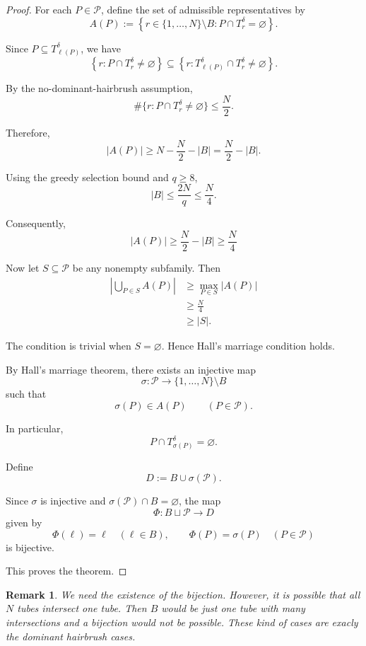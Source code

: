 \documentclass[11pt, letterpaper]{nyjm}
\newtheorem{remark}[theorem]{Remark}
\begin{document}
	
	\begin{proof}
		
		For each $P\in\mathcal P$, define the set
		of admissible representatives by
		\[
		A(P):=
		\left\{
		r\in\{1,\ldots,N\}\setminus B:
		P\cap T_r^\delta=\varnothing
		\right\}.
		\]
		
		Since $P\subseteq T_{\ell(P)}^\delta$, we have
		\[
		\left\{
		r:P\cap T_r^\delta\ne\varnothing
		\right\}
		\subseteq
		\left\{
		r:T_{\ell(P)}^\delta\cap T_r^\delta
		\ne\varnothing
		\right\}.
		\]
		
		By the no-dominant-hairbrush assumption,
		\[
		\#\{r:P\cap T_r^\delta\ne\varnothing\}
		\le \frac N2.
		\]
		
		Therefore,
		\[
		|A(P)|
		\ge N-\frac N2-|B|
		= \frac N2-|B|.
		\]
		
		Using the greedy selection bound and $q\ge8$,
		\[
		|B|\le\frac{2N}{q}\le\frac N4.
		\]
		
		Consequently,
		\[
		|A(P)|
		\ge\frac N2-|B|
		\ge\frac N4
		\]
		
		Now let $S\subseteq\mathcal P$ be any nonempty
		subfamily. Then
		\[
		\begin{aligned}
			\left|\bigcup_{P\in S}A(P)\right|
			&\ge \max_{P\in S}|A(P)|\\
			&\ge \frac N4 \\
			&\ge |S|.
		\end{aligned}
		\]
		
		The condition is trivial when $S=\varnothing$.
		Hence Hall's marriage condition holds.
		
		By Hall's marriage theorem, there exists
		an injective map
		\[
		\sigma:\mathcal P\longrightarrow
		\{1,\ldots,N\}\setminus B
		\]
		such that
		\[
		\sigma(P)\in A(P)
		\qquad(P\in\mathcal P).
		\]
		
		In particular,
		\[
		P\cap T_{\sigma(P)}^\delta=\varnothing.
		\]
		
		Define
		\[
		D:=B\cup\sigma(\mathcal P).
		\]
		
		Since $\sigma$ is injective and
		$\sigma(\mathcal P)\cap B=\varnothing$,
		the map
		\[
		\Phi:B\sqcup\mathcal P\longrightarrow D
		\]
		given by
		\[
		\Phi(\ell)=\ell\quad(\ell\in B),
		\qquad
		\Phi(P)=\sigma(P)\quad(P\in\mathcal P)
		\]
		is bijective.
		
		This proves the theorem.
	\end{proof}
	
	\begin{remark}
		We need the existence of the bijection. However, it is possible that all $N$ tubes intersect one tube. Then $B$ would be just one tube with many intersections and a bijection would not be possible. These kind of cases are exacly the dominant hairbrush cases.    
	\end{remark}
	
\end{document}
